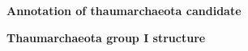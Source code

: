 \documentclass[landscape]{slides}
\begin{document}
\begin{slide}
\begin{center}
\textbf{Annotation of thaumarchaeota candidate}
\end{center}


\vfill
\end{slide}
\begin{slide}
\begin{center}
\textbf{Thaumarchaeota group I structure}
\end{center}


\vfill
\end{slide}
\end{document}
